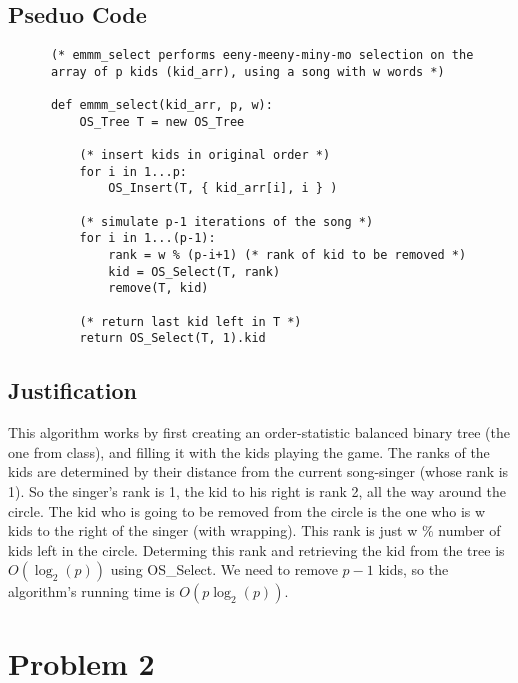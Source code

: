 \documentclass[a4paper,12pt]{article}
\begin{document}
\begin{enumerate}[a)]
\pagebreak

\subsection*{Pseduo Code}

    \begin{verbatim}
      (* emmm_select performs eeny-meeny-miny-mo selection on the 
      array of p kids (kid_arr), using a song with w words *)

      def emmm_select(kid_arr, p, w):
          OS_Tree T = new OS_Tree
          
          (* insert kids in original order *)
          for i in 1...p:
              OS_Insert(T, { kid_arr[i], i } )

          (* simulate p-1 iterations of the song *)
          for i in 1...(p-1):
              rank = w % (p-i+1) (* rank of kid to be removed *)
              kid = OS_Select(T, rank)
              remove(T, kid)

          (* return last kid left in T *)
          return OS_Select(T, 1).kid

    \end{verbatim}

\subsection*{Justification}

This algorithm works by first creating an order-statistic balanced
binary tree (the one from class), and filling it with the kids playing
the game. The ranks of the kids are determined by their distance from
the current song-singer (whose rank is 1). So the singer's rank is 1,
the kid to his right is rank 2, all the way around the circle. The kid
who is going to be removed from the circle is the one who is w kids to
the right of the singer (with wrapping). This rank is just w \(\%\) number
of kids left in the circle. Determing this rank and retrieving the kid
from the tree is \(O(\log_2(p))\) using OS\_Select. We need to remove
\(p-1\) kids, so the algorithm's running time is \(O(p\log_2(p))\).
     

\end{enumerate}

\pagebreak

\section*{Problem 2}
\end{document}

